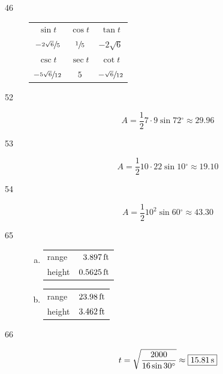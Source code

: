 \documentclass{exam}
\newcommand{\dg}{\ensuremath{^\circ}}
\begin{document}
\begin{description}
      \item[46]
        \begin{tabular}[H]{ccc}
          \toprule

          $\sin t$                  & $\cos t$       & $\tan t$      \\
          $-\sfrac{2 \sqrt{6}}{5}$  & $\sfrac{1}{5}$ & $-2 \sqrt{6}$ \\

          \midrule

          $\csc t$                  & $\sec t$       & $\cot t$ \\
          $-\sfrac{5 \sqrt{6}}{12}$ & $5$            & $-\sfrac{\sqrt{6}}{12}$ \\

          \bottomrule
        \end{tabular}

      \item[52]
        \[
          A = \frac{1}{2} 7 \cdot 9 \sin 72 \dg \approx \boxed{ 29.96 }
        \]

      \item[53]
        \[
          A = \frac{1}{2} 10 \cdot 22 \sin 10 \dg \approx \boxed{ 19.10 }
        \]

      \item[54]
        \[
          A = \frac{1}{2} 10^2 \sin 60 \dg \approx \boxed{ 43.30 }
        \]

      \item[65]
        \begin{enumerate}[(a)]
          \item 
            \begin{tabular}[H]{lr}
              \toprule
              range  & $\unit[3.897]{ft}$ \\
              height & $\unit[0.5625]{ft}$ \\
              \bottomrule
            \end{tabular}

          \item 
            \begin{tabular}[H]{lr}
              \toprule
              range  & $\unit[23.98]{ft}$ \\
              height & $\unit[3.462]{ft}$ \\
              \bottomrule
            \end{tabular}
        \end{enumerate}

      \item[66]
        \[
          t = \sqrt{ \frac{2000}{16 \sin 30 \dg}} \approx \boxed{ \unit[15.81]{s} }
        \]

    \end{description}
\end{document}
